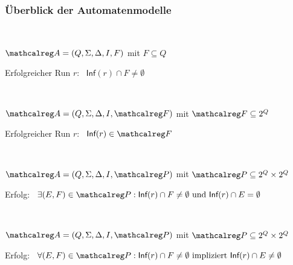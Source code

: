     \begin{frame}
      \frametitle{Überblick der Automatenmodelle}
      
      ~
      \begin{Itemize}
        \item
          $\Amc = (Q,\Sigma,\Delta,I,F)$ mit $F \subseteq Q$
        \item
          Erfolgreicher Run $r$:~ $\textsf{Inf}(r) \cap F \neq \emptyset$
      \end{Itemize}
      
      \par\smallskip
      ~
      \begin{Itemize}
        \item
          $\Amc = (Q,\Sigma,\Delta,I,\Fmc)$ mit $\Fmc \subseteq 2^Q$
        \item
          Erfolgreicher Run $r$:~ $\textsf{Inf}(r) \in \Fmc$
      \end{Itemize}
      
      \par\smallskip
      ~
      \begin{Itemize}
        \item
          $\Amc = (Q,\Sigma,\Delta,I,\Pmc)$ mit $\Pmc \subseteq 2^Q \times 2^Q$
        \item
          Erfolg:~ $\exists (E,F) \in \Pmc : \textsf{Inf}(r) \cap F \neq \emptyset \text{~und~} \textsf{Inf}(r) \cap E = \emptyset$
      \end{Itemize}
      
      \par\smallskip
      ~
      \begin{Itemize}
        \item
          $\Amc = (Q,\Sigma,\Delta,I,\Pmc)$ mit $\Pmc \subseteq 2^Q \times 2^Q$
        \item
          Erfolg:~ $\forall (E,F) \in \Pmc : \textsf{Inf}(r) \cap F \neq \emptyset \text{~impliziert~} \textsf{Inf}(r) \cap E \neq \emptyset$
      \end{Itemize}
    \end{frame}

